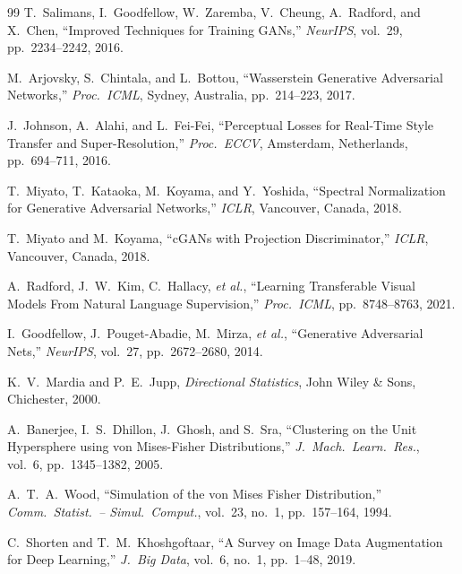\documentclass[12pt,letterpaper]{article}
\begin{document}
\begin{thebibliography}{99}
T.~Salimans, I.~Goodfellow, W.~Zaremba, V.~Cheung, A.~Radford, and X.~Chen,
``Improved Techniques for Training GANs,''
\textit{NeurIPS}, vol.~29, pp.~2234--2242, 2016.

M.~Arjovsky, S.~Chintala, and L.~Bottou,
``Wasserstein Generative Adversarial Networks,''
\textit{Proc.\ ICML}, Sydney, Australia, pp.~214--223, 2017.

J.~Johnson, A.~Alahi, and L.~Fei-Fei,
``Perceptual Losses for Real-Time Style Transfer and Super-Resolution,''
\textit{Proc.\ ECCV}, Amsterdam, Netherlands, pp.~694--711, 2016.

T.~Miyato, T.~Kataoka, M.~Koyama, and Y.~Yoshida,
``Spectral Normalization for Generative Adversarial Networks,''
\textit{ICLR}, Vancouver, Canada, 2018.

T.~Miyato and M.~Koyama,
``cGANs with Projection Discriminator,''
\textit{ICLR}, Vancouver, Canada, 2018.

A.~Radford, J.~W.~Kim, C.~Hallacy, \textit{et al.},
``Learning Transferable Visual Models From Natural Language Supervision,''
\textit{Proc.\ ICML}, pp.~8748--8763, 2021.

I.~Goodfellow, J.~Pouget-Abadie, M.~Mirza, \textit{et al.},
``Generative Adversarial Nets,''
\textit{NeurIPS}, vol.~27, pp.~2672--2680, 2014.

K.~V.~Mardia and P.~E.~Jupp,
\textit{Directional Statistics}, John Wiley \& Sons, Chichester, 2000.

A.~Banerjee, I.~S.~Dhillon, J.~Ghosh, and S.~Sra,
``Clustering on the Unit Hypersphere using von Mises-Fisher Distributions,''
\textit{J.\ Mach.\ Learn.\ Res.}, vol.~6, pp.~1345--1382, 2005.

A.~T.~A.~Wood,
``Simulation of the von Mises Fisher Distribution,''
\textit{Comm.\ Statist.\ -- Simul.\ Comput.}, vol.~23, no.~1,
pp.~157--164, 1994.

C.~Shorten and T.~M.~Khoshgoftaar,
``A Survey on Image Data Augmentation for Deep Learning,''
\textit{J.\ Big Data}, vol.~6, no.~1, pp.~1--48, 2019.

\end{thebibliography}
\end{document}
